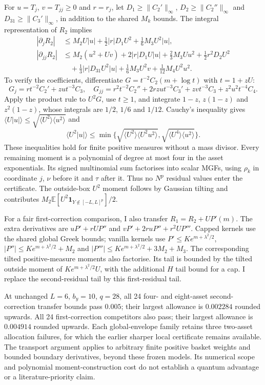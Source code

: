 For $u=T_j$, $v=T_{jj}\geq0$ and $r=r_j$, let
$D_1\geq\|C_2'\|_\infty$, $D_2\geq\|C_2''\|_\infty$ and
$D_{31}\geq\|C_3'\|_\infty$, in addition to the shared $M_k$ bounds.
The integral representation of $R_2$ implies
\begin{align*}
 |\partial_jR_2|&\leq M_2U|u|+\tfrac12|r|D_1U^2
                                  +\tfrac16M_3U^2|u|,\\
 |\partial_{jj}R_2|&\leq M_2(u^2+Uv)+2|r|D_1U|u|
 +\tfrac23M_3Uu^2+\tfrac12r^2D_2U^2\\
 &\quad+\tfrac13|r|D_{31}U^2|u|
                +\tfrac16M_3U^2v+\tfrac1{12}M_4U^2u^2.
\end{align*}
To verify the coefficients, differentiate
$G=t^{-2}C_2(m+\log t)$ with $t=1+zU$:
\[
 G_j=rt^{-2}C_2'+zu t^{-3}C_3,
\quad G_{jj}=r^2t^{-2}C_2''+2rzu t^{-3}C_3'
                         +zv t^{-3}C_3+z^2u^2t^{-4}C_4.
\]
Apply the product rule to $U^2G$, use $t\geq1$, and integrate
$1-z$, $z(1-z)$ and $z^2(1-z)$, whose integrals are $1/2$, $1/6$
and $1/12$. Cauchy's inequality gives
$\langle U|u|\rangle\leq\sqrt{\langle U^2\rangle\langle u^2\rangle}$
and
\[
 \langle U^2|u|\rangle\leq
 \min\{\sqrt{\langle U^2\rangle\langle U^2u^2\rangle},
          \sqrt{\langle U^4\rangle\langle u^2\rangle}\}.
\]
These inequalities hold for finite positive measures without a mass
divisor. Every remaining moment is a polynomial of degree at most four
in the asset exponentials. Its signed multinomial sum factorises into
scalar MGFs, using $\rho_k$ in coordinate $j$, $\nu$ before it and
$\tau$ after it. Thus no $N^p$ residual values enter the certificate.
The outside-box $U^2$ moment follows by Gaussian tilting and contributes
$M_2\mathbb E[U^2\mathbf1_{Y\notin[-L,L]^p}]/2$.

For a fair first-correction comparison, I also transfer
$R_1=R_2+UP'(m)$. The extra derivatives are
$uP'+rUP''$ and $vP'+2ruP''+r^2UP'''$. Capped kernels use the shared
global Greek bounds; vanilla kernels use
$P'\leq Ke^{m+\lambda^2/2}$, $|P''|\leq Ke^{m+\lambda^2/2}+M_2$
and $|P'''|\leq Ke^{m+\lambda^2/2}+3M_2+M_3$.
The corresponding tilted positive-measure moments also factorise.
Its tail is bounded by the tilted outside moment of
$Ke^{m+\lambda^2/2}U$, with the additional $H$ tail bound for a cap.
I replace the second-residual tail by this first-residual tail.

At unchanged $L=6$, $b_y=10$, $q=28$, all 24 four- and eight-asset
second-correction transfer bounds pass $0.005$; their largest allowance
is $0.002284$ rounded upwards. All 24 first-correction competitors
also pass; their largest allowance is $0.004914$ rounded upwards.
Each global-envelope family retains three two-asset allocation failures,
for which the earlier sharper local certificate remains available.
The transport argument applies to arbitrary finite positive basket
weights and bounded boundary derivatives, beyond these frozen models.
Its numerical scope and polynomial moment-construction cost do not
establish a quantum advantage or a literature-priority claim.

